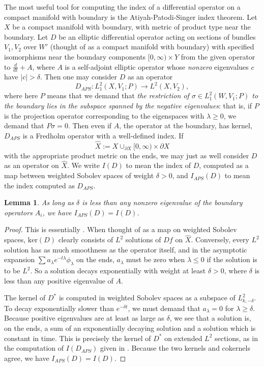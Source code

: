 \documentclass{memo-l}
\newtheorem{lemma}[theorem]{Lemma}
\theoremstyle{definition}
\theoremstyle{remark}
\numberwithin{section}{chapter}
\numberwithin{equation}{chapter}
\begin{document}
The most useful tool for computing the index of a differential operator on a compact manifold with boundary is the Atiyah-Patodi-Singer index theorem. Let $X$ be a compact manifold with boundary, with metric of product type near the boundary. Let $D$ be an elliptic differential operator acting on sections of bundles $V_1, V_2$ over $W'$ (thought of as a compact manifold with boundary) with specified isomorphisms near the boundary components $[0,\infty) \times Y$ from the given operator to $\frac{d}{dt} + A$, where $A$ is a self-adjoint elliptic operator whose \textit{nonzero} eigenvalues $c$ have $|c| > \delta$. Then one may consider $D$ as an operator 
$$D_{APS}: L^2_1(X,V_1;P) \to L^2(X,V_2),$$ 
where here $P$ means that we demand that \emph{the restriction of $\sigma \in L^2_1(W,V_1;P)$ to the boundary lies in the subspace spanned by the negative eigenvalues}: that is, if $P$ is the projection operator corresponding to the eigenspaces with $\lambda \geq 0$, we demand that $P\sigma = 0$. Then even if $A$, the operator at the boundary, has kernel, $D_{APS}$ is a Fredholm operator with a well-defined index. If 
$$\hat X := X \cup_{\partial X} [0,\infty) \times \partial X$$ 
with the appropriate product metric on the ends, we may just as well consider $D$ as an operator on $\hat X$. We write $I(D)$ to mean the index of $D$, computed as a map between weighted Sobolev spaces of weight $\delta > 0$, and $I_{APS}(D)$ to mean the index computed as $D_{APS}$.

\begin{lemma}As long as $\delta$ is less than any nonzero eigenvalue of the boundary operators $A_i$, we have $I_{APS}(D) = I(D)$.
\end{lemma}

\begin{proof}This is essentially \cite[Proposition~3.11]{atiyah1975spectral}. When thought of as a map on weighted Sobolev spaces, $\text{ker}(D)$ clearly consists of $L^2$ solutions of $Df$ on $\hat X$. Conversely, every $L^2$ solution has as much smoothness as the operator itself, and in the asymptotic expansion $\sum a_\lambda e^{-t\lambda} \phi_\lambda$ on the ends, $a_\lambda$ must be zero when $\lambda \leq 0$ if the solution is to be $L^2$. So a solution decays exponentially with weight at least $\delta > 0$, where $\delta$ is less than any positive eigenvalue of $A$.

The kernel of $D^*$ is computed in weighted Sobolev spaces as a subspace of $L^2_{k,-\delta}$. To decay exponentially slower than $e^{-\delta t}$, we must demand that $a_\lambda = 0$ for $\lambda \geq \delta$. Because positive eigenvalues are at least as large as $\delta$, we see that a solution is, on the ends, a sum of an exponentially decaying solution and a solution which is constant in time. This is precisely the kernel of $D^*$ on extended $L^2$ sections, as in the computation of $I(D_{APS})$ given in  \cite[Proposition~3.11]{atiyah1975spectral}. Because the two kernels and cokernels agree, we have $I_{APS}(D) = I(D)$.
\end{proof}
\end{document}
